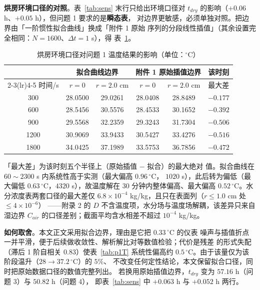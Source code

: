\textbf{烘房环境口径的对照}。表~\ref{tab:sens} 末行只给出环境口径对
$t_{dry}$ 的影响（$+0.06$ h、$+0.05$ h），但问题 1 要求的是\textbf{瞬态表}，
对边界更敏感，必须单独对照。把边界由「一阶惯性拟合曲线」换成「附件 1 原始
序列的分段线性插值」（其余设置完全相同：$N=1600$、$\Delta t=1$ s），得
表~\ref{tab:p1env}。

\begin{table}[htbp]
\centering
\caption{烘房环境口径对问题 1 温度结果的影响（单位：$^\circ$C）}
\label{tab:p1env}
\footnotesize
\begin{tabular}{c|cc|cc|c}
\toprule[1.5pt]
 & \multicolumn{2}{c|}{拟合曲线边界} & \multicolumn{2}{c|}{附件 1 原始插值边界}
 & 该时刻 \\
\cmidrule(lr){2-3}\cmidrule(lr){4-5}
时间/s & $r=0$ & $r=2.0$ cm & $r=0$ & $r=2.0$ cm & 最大差 \\
\midrule[1pt]
300  & 28.0500 & 29.0261 & 28.0408 & 28.8489 & $-0.177$ \\
600  & 28.5456 & 30.5576 & 28.4533 & 30.1652 & $-0.392$ \\
900  & 29.5568 & 32.2359 & 29.3243 & 31.7304 & $-0.506$ \\
1200 & 30.9069 & 33.9433 & 30.5427 & 33.4276 & $-0.516$ \\
1800 & 34.0425 & 37.1989 & 33.5753 & 36.7856 & $-0.472$ \\
\bottomrule[1.5pt]
\end{tabular}

\vspace{2pt}
{\footnotesize 「最大差」为该时刻五个半径上（原始插值 $-$ 拟合）的最大绝对
值。拟合曲线在 $60\!\sim\!2300$ s 内系统性高于实测（最大偏高 $0.96\,^\circ$C，
$1020$ s），此后转为偏低（最大偏低 $0.63\,^\circ$C，$4320$ s），故温度解在
30 分钟内整体偏高、最大偏高 $0.52\,^\circ$C。水分浓度表两套口径的最大差仅
$6.8\times10^{-4}$ kg/kg，且只在表面列（$r\le1.0$ cm 处 $\le4\times10^{-6}$）
——附录 2 的 $D$ 不含温度项，水分场与温度场解耦，该差异只来自湿边界
$C_{air}$ 的口径差别；截面平均含水相差不超过 $10^{-4}$ kg/kg。}
\end{table}

\textbf{如何取舍}。本文正文采用拟合边界，理由是它把 $0.33\,^\circ$C 的仪表
噪声与插值折点一并平滑，便于后续做收敛性、解析解比对等数值检验；代价是残差
的形式失配（滞后 1 阶自相关 $0.83$）使表~\ref{tab:p1T} 系统性偏高约
$0.5\,^\circ$C。由于该量仅为该阶段温升（$28\to37.2\,^\circ$C）的 $5\%$、
不改变任何定性结论，本文保留拟合口径，同时把原始数据口径的数值完整列出。
若换用原始插值边界，$t_{dry}$ 变为 $57.16$ h（问题 3）与 $50.82$ h（问题 4），
即表~\ref{tab:sens} 中 $+0.063$ h 与 $+0.052$ h 两行。

